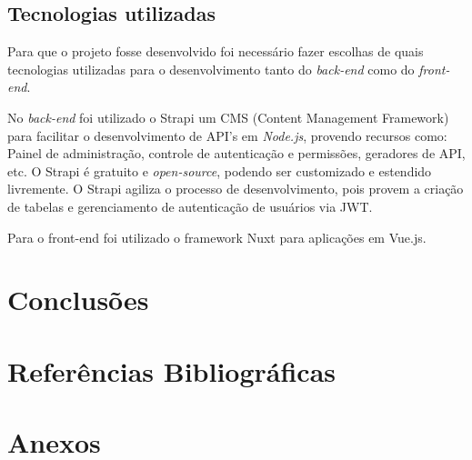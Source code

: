 \documentclass[cic,tc]{iiufrgs}
\begin{document}
\section{Tecnologias utilizadas}
Para que o projeto fosse desenvolvido foi necessário fazer escolhas de quais tecnologias utilizadas para o desenvolvimento tanto do \textit{back-end} como do \textit{front-end}.

No \textit{back-end} foi utilizado o Strapi um CMS (Content Management Framework) para facilitar o desenvolvimento de API's em \textit{Node.js}, provendo recursos como: Painel de administração, controle de autenticação e permissões, geradores de API, etc. O Strapi é gratuito e \textit{open-source}, podendo ser customizado e estendido livremente. O Strapi agiliza o processo de desenvolvimento, pois provem a criação de tabelas e gerenciamento de autenticação de usuários via JWT.

Para o front-end foi utilizado o framework Nuxt para aplicações em Vue.js.



\chapter{Conclusões}

\chapter{Referências Bibliográficas}

\chapter{Anexos}

% 



\end{document}
